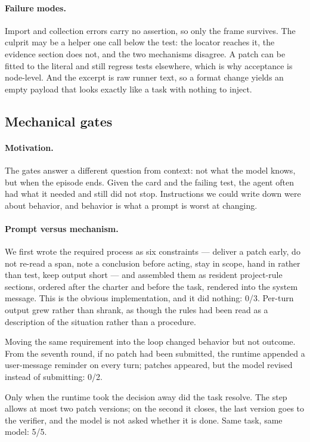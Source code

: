 \paragraph{Failure modes.} Import and collection errors carry no assertion, so
only the frame survives. The culprit may be a helper one call below the test:
the locator reaches it, the evidence section does not, and the two mechanisms
disagree. A patch can be fitted to the literal and still regress tests
elsewhere, which is why acceptance is node-level. And the excerpt is raw runner
text, so a format change yields an empty payload that looks exactly like a task
with nothing to inject.

\subsection{Mechanical gates}

\paragraph{Motivation.} The gates answer a different question from context: not
what the model knows, but when the episode ends. Given the card and the failing
test, the agent often had what it needed and still did not stop. Instructions we
could write down were about behavior, and behavior is what a prompt is worst at
changing.

\paragraph{Prompt versus mechanism.} We first wrote the required process as six
constraints --- deliver a patch early, do not re-read a span, note a conclusion
before acting, stay in scope, hand in rather than test, keep output short ---
and assembled them as resident project-rule sections, ordered after the charter
and before the task, rendered into the system message. This is the obvious
implementation, and it did nothing: 0/3. Per-turn output grew rather
than shrank, as though the rules had been read as a description of the
situation rather than a procedure.

Moving the same requirement into the loop changed behavior but not outcome.
From the seventh round, if no patch had been submitted, the runtime appended a
user-message reminder on every turn; patches appeared, but the model revised
instead of submitting: 0/2.

Only when the runtime took the decision away did the task resolve. The step
allows at most two patch versions; on the second it closes, the last version
goes to the verifier, and the model is not asked whether it is done. Same task,
same model: 5/5.

